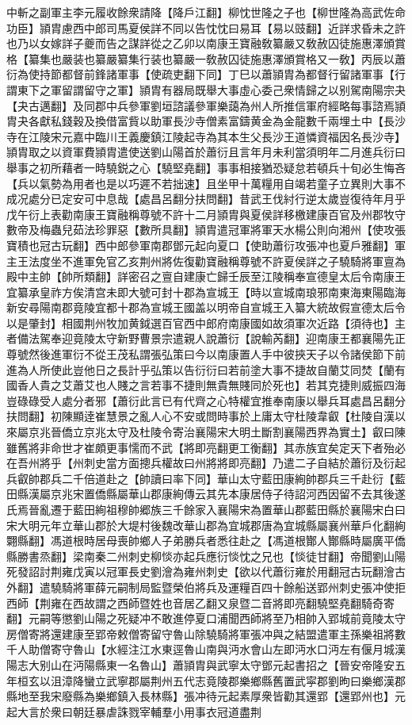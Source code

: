 中斬之副軍主李元履收餘衆請降【降戶江翻】柳忱世隆之子也【柳世隆為高武佐命功臣】頴胄慮西中郎司馬夏侯詳不同以告忱忱曰易耳【易以豉翻】近詳求昏未之許也乃以女嫁詳子夔而告之謀詳從之乙卯以南康王寶融敎纂嚴又敎赦囚徒施惠澤頒賞格【纂集也嚴装也纂嚴纂集行装也纂嚴一敎赦囚徒施惠澤頒賞格又一敎】丙辰以蕭衍為使持節都督前鋒諸軍事【使疏吏翻下同】丁巳以蕭頴胄為都督行留諸軍事【行謂東下之軍留謂留守之軍】頴胄有器局既舉大事虛心委己衆情歸之以别駕南陽宗夬【夬古邁翻】及同郡中兵參軍劉垣諮議參軍樂藹為州人所推信軍府經略每事諮焉頴胄夬各獻私錢穀及換借富貲以助軍長沙寺僧素富鑄黄金為金龍數千兩埋土中【長沙寺在江陵宋元嘉中臨川王義慶鎮江陵起寺為其本生父長沙王道憐資福因名長沙寺】頴胄取之以資軍費頴胄遣使送劉山陽首於蕭衍且言年月未利當須明年二月進兵衍曰舉事之初所藉者一時驍鋭之心【驍堅堯翻】事事相接猶恐疑怠若頓兵十旬必生悔吝【兵以氣勢為用者也是以巧遲不若拙速】且坐甲十萬糧用自竭若童子立異則大事不成况處分已定安可中息哉【處昌呂翻分扶問翻】昔武王伐紂行逆太歲豈復待年月乎戊午衍上表勸南康王寶融稱尊號不許十二月頴胄與夏侯詳移檄建康百官及州郡牧守數帝及梅蟲兒茹法珍罪惡【數所具翻】頴胄遣冠軍將軍天水楊公則向湘州【使攻張寶積也冠古玩翻】西中郎參軍南郡鄧元起向夏口【使助蕭衍攻張冲也夏戶雅翻】軍主王法度坐不進軍免官乙亥荆州將佐復勸寶融稱尊號不許夏侯詳之子驍騎將軍亶為殿中主帥【帥所類翻】詳密召之亶自建康亡歸壬辰至江陵稱奉宣德皇太后令南康王宜纂承皇祚方俟清宫未即大號可封十郡為宣城王【時以宣城南琅邪南東海東陽臨海新安尋陽南郡竟陵宜都十郡為宣城王國盖以明帝自宣城王入纂大統故假宣德太后令以是肇封】相國荆州牧加黄鉞選百官西中郎府南康國如故須軍次近路【須待也】主者備法駕奉迎竟陵太守新野曹景宗遣親人說蕭衍【說輸芮翻】迎南康王都襄陽先正尊號然後進軍衍不從王茂私謂張弘策曰今以南康置人手中彼挾天子以令諸侯節下前進為人所使此豈他日之長計乎弘策以告衍衍曰若前塗大事不捷故自蘭艾同焚【蘭有國香人貴之艾蕭艾也人賤之言若事不捷則無貴無賤同於死也】若其克捷則威振四海豈碌碌受人處分者邪【蕭衍此言已有代齊之心特權宜推奉南康以舉兵耳處昌呂翻分扶問翻】初陳顯逹崔慧景之亂人心不安或問時事於上庸太守杜陵韋叡【杜陵自漢以來屬京兆晉僑立京兆太守及杜陵令寄治襄陽宋大明土斷割襄陽西界為實土】叡曰陳雖舊將非命世才崔頗更事懦而不武【將即亮翻更工衡翻】其赤族宜矣定天下者殆必在吾州將乎【州刺史當方面摠兵權故曰州將將即亮翻】乃遣二子自結於蕭衍及衍起兵叡帥郡兵二千倍道赴之【帥讀曰率下同】華山太守藍田康絢帥郡兵三千赴衍【藍田縣漢屬京兆宋置僑縣屬華山郡康絢傳云其先本康居侍子待詔河西因留不去其後遂氏焉晉亂遷于藍田絢祖穆帥郷族三千餘家入襄陽宋為置華山郡藍田縣於襄陽宋白曰宋大明元年立華山郡於大堤村後魏改華山郡為宜城郡唐為宜城縣屬襄州華戶化翻絢翾縣翻】馮道根時居母喪帥鄉人子弟勝兵者悉往赴之【馮道根酇人酇縣時屬廣平僑縣勝書烝翻】梁南秦二州刺史柳惔亦起兵應衍惔忱之兄也【惔徒甘翻】帝聞劉山陽死發詔討荆雍戊寅以冠軍長史劉澮為雍州刺史【欲以代蕭衍雍於用翻冠古玩翻澮古外翻】遣驍騎將軍薛元嗣制局監暨榮伯將兵及運糧百四十餘船送郢州刺史張冲使拒西師【荆雍在西故謂之西師暨姓也音居乙翻又泉暨二音將即亮翻驍堅堯翻騎奇寄翻】元嗣等懲劉山陽之死疑冲不敢進停夏口浦聞西師將至乃相帥入郢城前竟陵太守房僧寄將還建康至郢帝敕僧寄留守魯山除驍騎將軍張冲與之結盟遣軍主孫樂祖將數千人助僧寄守魯山【水經注江水東逕魯山南與沔水會山左即沔水口沔左有偃月城漢陽志大别山在沔陽縣東一名魯山】蕭頴胄與武寧太守鄧元起書招之【晉安帝隆安五年桓玄以沮漳降蠻立武寧郡屬荆州五代志竟陵郡樂鄉縣舊置武寜郡劉昫曰樂鄉漢郡縣地至我宋廢縣為樂鄉鎮入長林縣】張冲待元起素厚衆皆勸其還郢【還郢州也】元起大言於衆曰朝廷暴虐誅戮宰輔羣小用事衣冠道盡荆